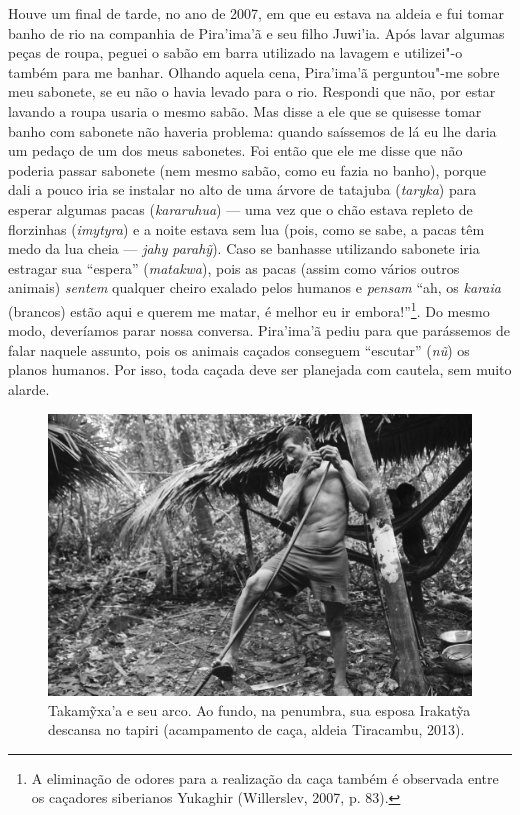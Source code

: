 Houve um final de tarde, no ano de 2007, em que eu estava na aldeia e
fui tomar banho de rio na companhia de Pira'ima'ã e seu filho Juwi'ia.
Após lavar algumas peças de roupa, peguei o sabão em barra utilizado na
lavagem e utilizei"-o também para me banhar. Olhando aquela cena,
Pira'ima'ã perguntou"-me sobre meu sabonete, se eu não o havia levado
para o rio. Respondi que não, por estar lavando a roupa usaria o mesmo
sabão. Mas disse a ele que se quisesse tomar banho com sabonete não
haveria problema: quando saíssemos de lá eu lhe daria um pedaço de um
dos meus sabonetes. Foi então que ele me disse que não poderia passar
sabonete (nem mesmo sabão, como eu fazia no banho), porque dali a pouco
iria se instalar no alto de uma árvore de tatajuba (\emph{taryka}) para
esperar algumas pacas (\emph{kararuhua}) --- uma vez que o chão estava
repleto de florzinhas (\emph{imytyra}) e a noite estava sem lua (pois,
como se sabe, a pacas têm medo da lua cheia --- \emph{jahy}
\emph{parahỹ}). Caso se banhasse utilizando sabonete iria estragar sua
``espera'' (\emph{matakwa}), pois as pacas (assim como vários outros
animais) \emph{sentem} qualquer cheiro exalado pelos humanos e
\emph{pensam} ``ah, os \emph{karaia} (brancos) estão aqui e querem me
matar, é melhor eu ir embora!''\footnote{A eliminação de odores para a
  realização da caça também é observada entre os caçadores siberianos
  Yukaghir (Willerslev, 2007, p. 83).}. Do mesmo modo, deveríamos parar
nossa conversa. Pira'ima'ã pediu para que parássemos de falar naquele
assunto, pois os animais caçados conseguem ``escutar'' (\emph{nũ}) os
planos humanos. Por isso, toda caçada deve ser planejada com cautela,
sem muito alarde.

\begin{figure}[H]
\centering
  \includegraphics[width=\textwidth]{./imgs/IMG_1669}
\caption{Takamỹxa'a e seu arco. Ao fundo, na penumbra, sua esposa Irakatỹa descansa no tapiri (acampamento de caça, aldeia Tiracambu, 2013).}
\end{figure}

